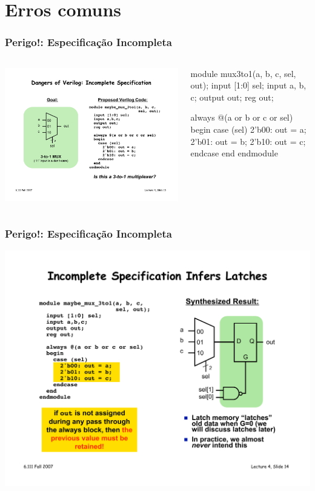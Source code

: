 \section{Erros comuns}

\begin{frame}[fragile]
	\frametitle{Perigo!: Especificação Incompleta}
	\begin{columns}
        \includegraphics[scale=.5]{figs/Mux3to1}
	    \begin{verilogcode}
module mux3to1(a, b, c, sel, out);
  input [1:0] sel;
  input a, b, c;
  output out;
  reg out;
  
  always @(a or b or c or sel)
  begin
    case (sel)
      2'b00: out = a;
      2'b01: out = b;
      2'b10: out = c;
    endcase
  end
endmodule
        \end{verilogcode}
    \end{columns}
\end{frame}

\begin{frame}[fragile]
	\frametitle{Perigo!: Especificação Incompleta}
    \includegraphics[scale=.5]{figs/Mux3to1Latch}
\end{frame}


